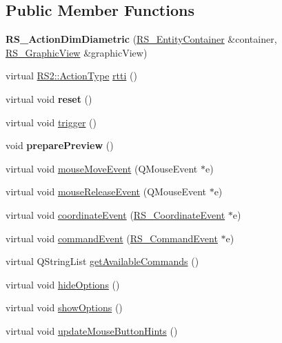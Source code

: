 \subsection*{Public Member Functions}
\begin{DoxyCompactItemize}
\item 
\hypertarget{classRS__ActionDimDiametric_a8a555718f26f17008551ba61c7994be7}{{\bfseries R\-S\-\_\-\-Action\-Dim\-Diametric} (\hyperlink{classRS__EntityContainer}{R\-S\-\_\-\-Entity\-Container} \&container, \hyperlink{classRS__GraphicView}{R\-S\-\_\-\-Graphic\-View} \&graphic\-View)}\label{classRS__ActionDimDiametric_a8a555718f26f17008551ba61c7994be7}

\item 
virtual \hyperlink{classRS2_afe3523e0bc41fd637b892321cfc4b9d7}{R\-S2\-::\-Action\-Type} \hyperlink{classRS__ActionDimDiametric_ab5ec6ea099d5348be0d974a0410a0c47}{rtti} ()
\item 
\hypertarget{classRS__ActionDimDiametric_a44977b9873a40db69fd64242035f7a53}{virtual void {\bfseries reset} ()}\label{classRS__ActionDimDiametric_a44977b9873a40db69fd64242035f7a53}

\item 
virtual void \hyperlink{classRS__ActionDimDiametric_a115401222ef6745b6646d50fe2aedd8a}{trigger} ()
\item 
\hypertarget{classRS__ActionDimDiametric_afa4cb69ef0cb5b07a948cbf5557d9996}{void {\bfseries prepare\-Preview} ()}\label{classRS__ActionDimDiametric_afa4cb69ef0cb5b07a948cbf5557d9996}

\item 
virtual void \hyperlink{classRS__ActionDimDiametric_a0003e158b19d87ad6811b2987c856a2d}{mouse\-Move\-Event} (Q\-Mouse\-Event $\ast$e)
\item 
virtual void \hyperlink{classRS__ActionDimDiametric_ad136b93493585506e75345b89b0159ca}{mouse\-Release\-Event} (Q\-Mouse\-Event $\ast$e)
\item 
virtual void \hyperlink{classRS__ActionDimDiametric_a67ebcb1f3e8845aea9384f155c50128c}{coordinate\-Event} (\hyperlink{classRS__CoordinateEvent}{R\-S\-\_\-\-Coordinate\-Event} $\ast$e)
\item 
virtual void \hyperlink{classRS__ActionDimDiametric_adbf5e5e066ad7d4912d82f54e6dee85b}{command\-Event} (\hyperlink{classRS__CommandEvent}{R\-S\-\_\-\-Command\-Event} $\ast$e)
\item 
virtual Q\-String\-List \hyperlink{classRS__ActionDimDiametric_ae6bc28091b417e509709964945393f39}{get\-Available\-Commands} ()
\item 
virtual void \hyperlink{classRS__ActionDimDiametric_a2bfc4d3a20dc6b716fb88a3302a987c7}{hide\-Options} ()
\item 
virtual void \hyperlink{classRS__ActionDimDiametric_a4ab26e852ee05cfef60171ae255cfb2a}{show\-Options} ()
\item 
virtual void \hyperlink{classRS__ActionDimDiametric_aac5d474e4d4f4933cc6fe95256f1ff1b}{update\-Mouse\-Button\-Hints} ()
\end{DoxyCompactItemize}

